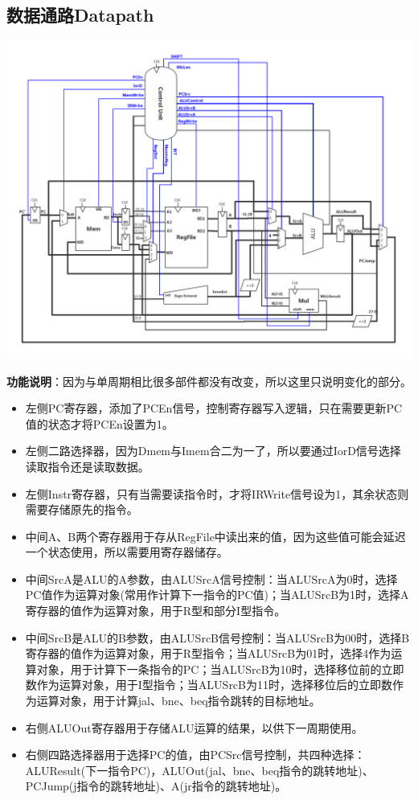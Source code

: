 \documentclass[12pt]{article} %
\begin{document}
\begin{sloppypar}
\subsection{数据通路Datapath}
\noindent
\includegraphics[width =\linewidth]{figure/Datapath.jpg}

{\bf 功能说明}：因为与单周期相比很多部件都没有改变，所以这里只说明变化的部分。
\begin{itemize}
\item 左侧PC寄存器，添加了PCEn信号，控制寄存器写入逻辑，只在需要更新PC值的状态才将PCEn设置为1。
\item 左侧二路选择器，因为Dmem与Imem合二为一了，所以要通过IorD信号选择读取指令还是读取数据。
\item 左侧Instr寄存器，只有当需要读指令时，才将IRWrite信号设为1，其余状态则需要存储原先的指令。
\item 中间A、B两个寄存器用于存从RegFile中读出来的值，因为这些值可能会延迟一个状态使用，所以需要用寄存器储存。
\item 中间SrcA是ALU的A参数，由ALUSrcA信号控制：当ALUSrcA为0时，选择PC值作为运算对象(常用作计算下一指令的PC值)；当ALUSrcB为1时，选择A寄存器的值作为运算对象，用于R型和部分I型指令。
\item 中间SrcB是ALU的B参数，由ALUSrcB信号控制：当ALUSrcB为00时，选择B寄存器的值作为运算对象，用于R型指令；当ALUSrcB为01时，选择4作为运算对象，用于计算下一条指令的PC；当ALUSrcB为10时，选择移位前的立即数作为运算对象，用于I型指令；当ALUSrcB为11时，选择移位后的立即数作为运算对象，用于计算jal、bne、beq指令跳转的目标地址。
\item 右侧ALUOut寄存器用于存储ALU运算的结果，以供下一周期使用。
\item 右侧四路选择器用于选择PC的值，由PCSrc信号控制，共四种选择：ALUResult(下一指令PC)，ALUOut(jal、bne、beq指令的跳转地址)、PCJump(j指令的跳转地址)、A(jr指令的跳转地址)。
\end{itemize}


\end{sloppypar}
\end{document}
